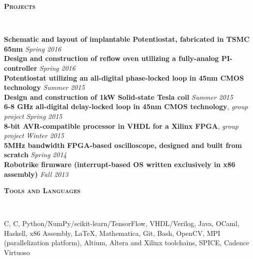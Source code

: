 \documentclass{article}
\newenvironment{changemargin}[2]{%
  \begin{list}{}{%
    \setlength{\topsep}{0pt}%
    \setlength{\leftmargin}{#1}%
    \setlength{\rightmargin}{#2}%
    \setlength{\listparindent}{\parindent}%
    \setlength{\itemindent}{\parindent}%
    \setlength{\parsep}{\parskip}%
  }%
  \item[]}{\end{list}
}
\newcommand{\lineover}{
	\begin{changemargin}{-0.05in}{-0.05in}
		\vspace*{-8pt}
		\hrulefill \\
		\vspace*{-2pt}
	\end{changemargin}
}
\newcommand{\header}[1]{
	\begin{changemargin}{-.5in}{-0.5in}
		{\large \textbf{\scshape{#1}}}\\
  	\lineover
	\end{changemargin}
}
\newenvironment{body} {
	\vspace*{-16pt}
	\begin{changemargin}{-0.25in}{-0.5in}
  }	
	{\end{changemargin}
}
\newcommand{\CC}{C\nolinebreak\hspace{-.05em}\raisebox{.4ex}{\tiny\bf +}\nolinebreak\hspace{-.10em}\raisebox{.4ex}{\tiny\bf +}}
\begin{document}
\newpage
\header{Projects}
\begin{body}
	\vspace{14pt}
	\textbf{Schematic and layout of implantable Potentiostat, fabricated in TSMC 65nm} \hfill \emph{Spring 2016}\\
	\textbf{Design and construction of reflow oven utilizing a fully-analog PI-controller} \hfill \emph{Spring 2016}\\
	\textbf{Potentiostat utilizing an all-digital phase-locked loop in 45nm CMOS technology} \hfill \emph{Summer 2015}\\
	\textbf{Design and construction of 1kW Solid-state Tesla coil} \hfill \emph{Summer 2015} \\
	\textbf{6-8 GHz all-digital delay-locked loop in 45nm CMOS technology}, \emph{group project} \hfill \emph{Spring 2015}\\
	\textbf{8-bit AVR-compatible processor in VHDL for a Xilinx FPGA}, \emph{group project} \hfill \emph{Winter 2015}\\
	\textbf{5MHz bandwidth FPGA-based oscilloscope, designed and built from scratch} \hfill \emph{Spring 2014}\\
	\textbf{Robotrike firmware (interrupt-based OS written exclusively in x86 assembly)} \hfill \emph{Fall 2013}\\
\end{body}

\medskip

\header{Tools and Languages}

\begin{body}
	\vspace{14pt}
	C, \CC, Python/NumPy/scikit-learn/TensorFlow, VHDL/Verilog, Java, OCaml, Haskell, x86 Assembly, \LaTeX, Mathematica, Git, Bash, OpenCV, MPI (parallelization platform), Altium, Altera and Xilinx toolchains, SPICE, Cadence Virtuoso
\end{body}
\end{document}
